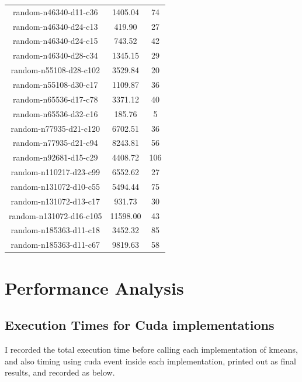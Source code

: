 \documentclass[letterpaper,12pt]{article}
\theoremstyle{remark}
\begin{document}
\begin{table}[ht]
\begin{tabular}{|c|c|c|}
random-n46340-d11-c36 & 1405.04 & 74 \\
random-n46340-d24-c13 & 419.90 & 27 \\
random-n46340-d24-c15 & 743.52 & 42 \\
random-n46340-d28-c34 & 1345.15 & 29 \\
random-n55108-d28-c102 & 3529.84 & 20 \\
random-n55108-d30-c17  & 1109.87 & 36 \\
random-n65536-d17-c78  & 3371.12 & 40 \\
random-n65536-d32-c16  & 185.76 & 5 \\
random-n77935-d21-c120 & 6702.51 & 36 \\
random-n77935-d21-c94  & 8243.81 & 56 \\
random-n92681-d15-c29  & 4408.72 & 106 \\
random-n110217-d23-c99 & 6552.62 & 27 \\
random-n131072-d10-c55 & 5494.44 & 75 \\
random-n131072-d13-c17 & 931.73 & 30 \\
random-n131072-d16-c105 & 11598.00 & 43 \\
random-n185363-d11-c18 & 3452.32 & 85 \\
random-n185363-d11-c67 & 9819.63 & 58 \\
\hline
\end{tabular}
\end{table}

\clearpage

\section{Performance Analysis}

\subsection{Execution Times for Cuda implementations}
I recorded the total execution time before calling each implementation of kmeans, and also timing using cuda event inside each implementation, printed out as final results, and recorded as below.
\end{document}
